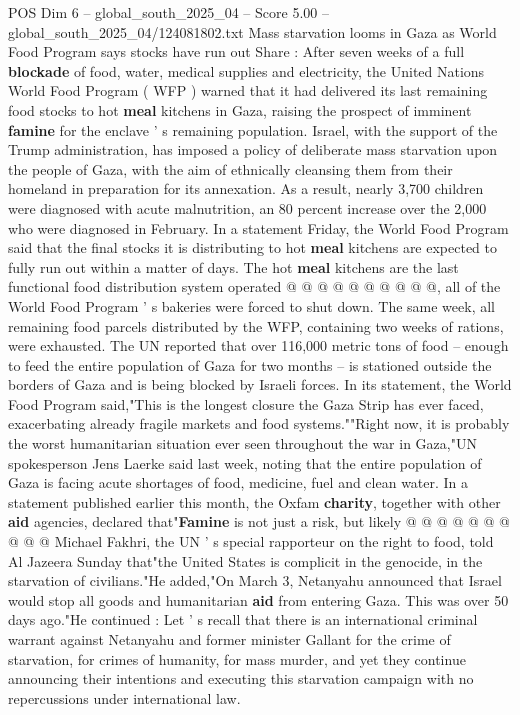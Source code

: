 \begin{textsample}{POS Dim 6 – global\_south\_2025\_04 – Score 5.00 – global\_south\_2025\_04/124081802.txt}  \label{ex:f6_pos_232}
Mass starvation looms in Gaza as World Food Program says stocks have run out Share : After seven weeks of a full \textbf{blockade} of food, water, medical supplies and electricity, the United Nations World Food Program ( WFP ) warned that it had delivered its last remaining food stocks to hot \textbf{meal} kitchens in Gaza, raising the prospect of imminent \textbf{famine} for the enclave ' s remaining population.
Israel, with the support of the Trump administration, has imposed a policy of deliberate mass starvation upon the people of Gaza, with the aim of ethnically cleansing them from their homeland in preparation for its annexation.
As a result, nearly 3,700 children were diagnosed with acute malnutrition, an 80 percent increase over the 2,000 who were diagnosed in February.
In a statement Friday, the World Food Program said that the final stocks it is distributing to hot \textbf{meal} kitchens are expected to fully run out within a matter of days.
The hot \textbf{meal} kitchens are the last functional food distribution system operated @ @ @ @ @ @ @ @ @ @, all of the World Food Program ' s bakeries were forced to shut down.
The same week, all remaining food parcels distributed by the WFP, containing two weeks of rations, were exhausted.
The UN reported that over 116,000 metric tons of food -- enough to feed the entire population of Gaza for two months -- is stationed outside the borders of Gaza and is being blocked by Israeli forces.
In its statement, the World Food Program said,"This is the longest closure the Gaza Strip has ever faced, exacerbating already fragile markets and food systems.""Right now, it is probably the worst humanitarian situation ever seen throughout the war in Gaza,"UN spokesperson Jens Laerke said last week, noting that the entire population of Gaza is facing acute shortages of food, medicine, fuel and clean water.
In a statement published earlier this month, the Oxfam \textbf{charity}, together with other \textbf{aid} agencies, declared that"\textbf{Famine} is not just a risk, but likely @ @ @ @ @ @ @ @ @ @ Michael Fakhri, the UN ' s special rapporteur on the right to food, told Al Jazeera Sunday that"the United States is complicit in the genocide, in the starvation of civilians."He added,"On March 3, Netanyahu announced that Israel would stop all goods and humanitarian \textbf{aid} from entering Gaza.
This was over 50 days ago."He continued : Let ' s recall that there is an international criminal warrant against Netanyahu and former minister Gallant for the crime of starvation, for crimes of humanity, for mass murder, and yet they continue announcing their intentions and executing this starvation campaign with no repercussions under international law.

\end{textsample}
